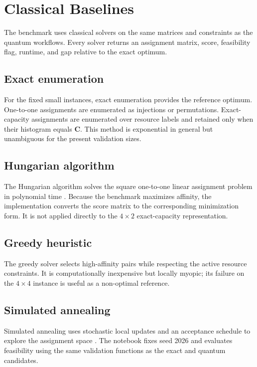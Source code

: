 \section{Classical Baselines}

The benchmark uses classical solvers on the same matrices and constraints as the quantum workflows. Every solver returns an assignment matrix, score, feasibility flag, runtime, and gap relative to the exact optimum.

\subsection{Exact enumeration}

For the fixed small instances, exact enumeration provides the reference optimum. One-to-one assignments are enumerated as injections or permutations. Exact-capacity assignments are enumerated over resource labels and retained only when their histogram equals $\bm C$. This method is exponential in general but unambiguous for the present validation sizes.

\subsection{Hungarian algorithm}

The Hungarian algorithm solves the square one-to-one linear assignment problem in polynomial time \cite{kuhn1955}. Because the benchmark maximizes affinity, the implementation converts the score matrix to the corresponding minimization form. It is not applied directly to the $4\times2$ exact-capacity representation.

\subsection{Greedy heuristic}

The greedy solver selects high-affinity pairs while respecting the active resource constraints. It is computationally inexpensive but locally myopic; its failure on the $4\times4$ instance is useful as a non-optimal reference.

\subsection{Simulated annealing}

Simulated annealing uses stochastic local updates and an acceptance schedule to explore the assignment space \cite{kirkpatrick1983}. The notebook fixes seed 2026 and evaluates feasibility using the same validation functions as the exact and quantum candidates.

